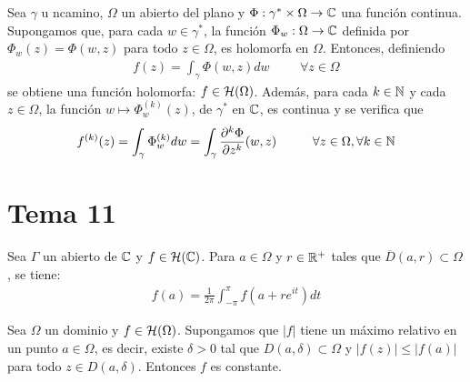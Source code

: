 \documentclass[12pt]{article}
\begin{document}
    \begin{teo}
        Sea $\gamma$ u ncamino, $\Omega$ un abierto del plano y $\Phi:\gamma^* \times \Omega \to \mathbb{C}$ una función continua. Supongamos que, para cada $w\in \gamma^*$, la función $\Phi_w:\Omega \to \mathbb{C}$ definida por $\Phi_w(z) = \Phi(w,z)$ para todo $z\in \Omega$, es holomorfa en $\Omega$. Entonces, definiendo
        \begin{gather*}
            f(z) = \int_\gamma \Phi(w,z) dw \hspace{1cm} \forall z \in \Omega
        \end{gather*}
        se obtiene una función holomorfa: $f \in \mathcal{H}(\Omega)$. Además, para cada $k\in \mathbb{N}$ y cada $z\in \Omega$, la función $w \mapsto \Phi_w ^{(k)}(z)$, de $\gamma^*$ en $\mathbb{C}$, es continua y se verifica que
        \begin{gather*}
            f^{(k)} (z) = \int_\gamma \Phi_w^{(k)} dw = \int_\gamma \frac{\partial^k \Phi}{\partial z^k}(w,z) \hspace{1cm} \forall z \in \Omega, \forall k \in \mathbb{N}
        \end{gather*}
    \end{teo}

    \newpage

    \section{Tema 11}

    \begin{prop}
        Sea $\Gamma$ un abierto de $\mathbb{C}$ y $f\in \mathcal{H}(\mathbb{C})$. Para $a\in \Omega$ y $r\in \mathbb{R}^+$ tales que $\overline{D}(a,r)\subset \Omega$, se tiene:
        \begin{gather*}
            f(a) = \frac{1}{2\pi} \int_{-\pi}^{\pi} f(a+re^{it}) dt
        \end{gather*}
    \end{prop}

    \begin{teo} Sea $\Omega$ un dominio y $f\in \mathcal{H}(\Omega)$. Supongamos que $|f|$ tiene un máximo relativo en un punto $a\in \Omega$, es decir, existe $\delta > 0$ tal que $D(a, \delta)\subset \Omega$ y $|f(z)| \leq |f(a)|$ para todo $z\in D(a, \delta)$. Entonces $f$ es constante.
    \end{teo}
\end{document}
